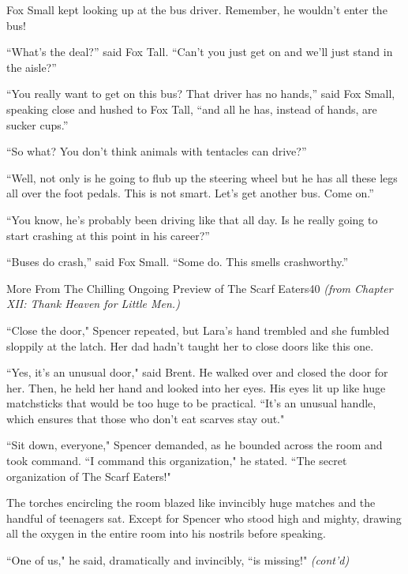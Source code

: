 \documentclass[10pt,twoside]{report}
\begin{document}
Fox Small kept looking up at the bus driver.  Remember, he wouldn't
enter the bus!

``What's the deal?'' said Fox Tall.  ``Can't you just get on and we'll
just stand in the aisle?''

``You really want to get on this bus?  That driver has no hands,''
said Fox Small, speaking close and hushed to Fox Tall, ``and all he
has, instead of hands, are sucker cups.''  

``So what?  You don't think
animals with tentacles can drive?''

``Well, not only is he going to flub up the steering wheel but he has
all these legs all over the foot pedals.  This is not smart.  Let's
get another bus.  Come on.''

``You know, he's probably been driving like that all day.  Is he
really going to start crashing at this point in his career?''

``Buses do crash,'' said Fox Small.  ``Some do.  This smells
crashworthy.''

	\begin{sidebar}{More From The Chilling Ongoing Preview of The Scarf Eaters}{40}
		\textit{(from Chapter XII: Thank Heaven for Little Men.)}\vspace{6pt}
		
		``Close the door," Spencer repeated, but Lara's hand trembled and she fumbled sloppily at the latch. Her dad hadn't taught her to close doors like this one.\vspace{6pt}

		``Yes, it's an unusual door," said Brent. He walked over and closed the door for her. Then, he held her hand and looked into her eyes. His eyes lit up like huge matchsticks that would be too huge to be practical. ``It's an unusual handle, which ensures that those who don't eat scarves stay out."\vspace{6pt}

		``Sit down, everyone," Spencer demanded, as he bounded across the room and took command. ``I command this organization," he stated. ``The secret organization of The Scarf Eaters!"\vspace{6pt}

		The torches encircling the room blazed like invincibly huge matches and the handful of teenagers sat. Except for Spencer who stood high and mighty, drawing all the oxygen in the entire room into his nostrils before speaking.\vspace{6pt}

		``One of us," he said, dramatically and invincibly, ``is missing!" \textit{(cont'd)}
	\end{sidebar}
\end{document}
